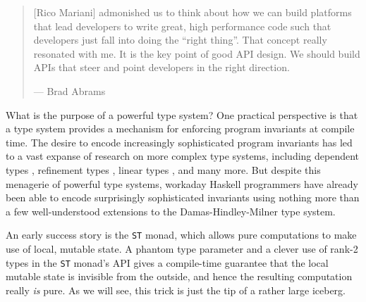 \documentclass[format=sigplan, review=false, screen=true, 10pt]{acmart}
\makeatletter
\let\origsection\section
\renewcommand\section{\@ifstar{\starsection}{\nostarsection}}
\newcommand\nostarsection[1]
{\sectionprelude\origsection{#1}\sectionpostlude}
\newcommand\starsection[1]
{\sectionprelude\origsection*{#1}\sectionpostlude}
\newcommand\sectionprelude{%
  \vspace{-0.5em}
}
\newcommand\sectionpostlude{%
  \vspace{0em}
}
\makeatother
\begin{document}
%
%



\maketitle

\renewcommand{\shortauthors}{M. Noonan}

%

\section{Introduction}
\begin{quote}
  [Rico Mariani] admonished us to think about how we can build platforms that lead developers to write great, high performance code such that developers just fall into doing the ``right thing''. That concept really resonated with me. It is the key point of good API design. We should build APIs that steer and point developers in the right direction.
  
  \hfill --- Brad Abrams \cite{pitofsuccess}
\end{quote}

What is the purpose of a powerful type system? One practical perspective is
that a type system provides a mechanism for enforcing program
invariants at compile time. The desire to encode increasingly
sophisticated program invariants has led to a vast expanse of research
on more complex type systems, including dependent types \cite{augustsson1998cayenne,bove2009dependent}, refinement types \cite{freeman1991refinement}, linear
types \cite{wadler1990linear}, and many more. But despite this menagerie of powerful
type systems, workaday Haskell programmers have already been able to encode
surprisingly sophisticated invariants using nothing more than a
few well-understood extensions to the Damas-Hindley-Milner type system.

An early success story is the \texttt{ST} monad, which allows pure
computations to make use of local, mutable state. A phantom type parameter
and a clever use of rank-2 types in the \texttt{ST} monad's API gives
a compile-time guarantee that the local mutable state is invisible from the outside,
and hence the resulting computation really \emph{is} pure. As we will see, this
trick is just the tip of a rather large iceberg.
\end{document}
